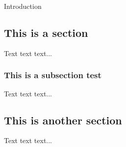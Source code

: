 Introduction

\subsection{This is a section}
Text text text...
\subsubsection{This is a subsection test}
Text text text...

\subsection{This is another section}
Text text text...
